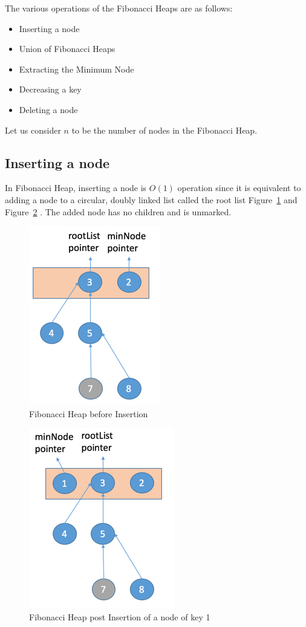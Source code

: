 

The various operations of the Fibonacci Heaps are as follows:
\begin{itemize}
	\item Inserting a node
	\item Union of Fibonacci Heaps
	\item Extracting the Minimum Node
	\item Decreasing a key
	\item Deleting a node
\end{itemize}

Let us consider $n$ to be the number of nodes in the Fibonacci Heap.

\subsection{Inserting a node}
In Fibonacci Heap, inserting a node is $O(1)$ operation since it is equivalent to adding a node to a circular, doubly linked list called the root list Figure~\ref{fig:Insertion1} and Figure~\ref{fig:Insertion2} . The added node has no children and is unmarked.
\begin{figure}[H]
	\includegraphics[scale=0.75]{Figures/FibonacciHeapBeforeInsertionOperation}
	\caption{Fibonacci Heap before Insertion}
	\label{fig:Insertion1}
\end{figure}
\begin{figure}[H]
	\includegraphics[scale=0.75]{Figures/FibonacciHeapAfterInsertionOperation}
	\caption{Fibonacci Heap post Insertion of a node of key 1}
	\label{fig:Insertion2}
\end{figure}
